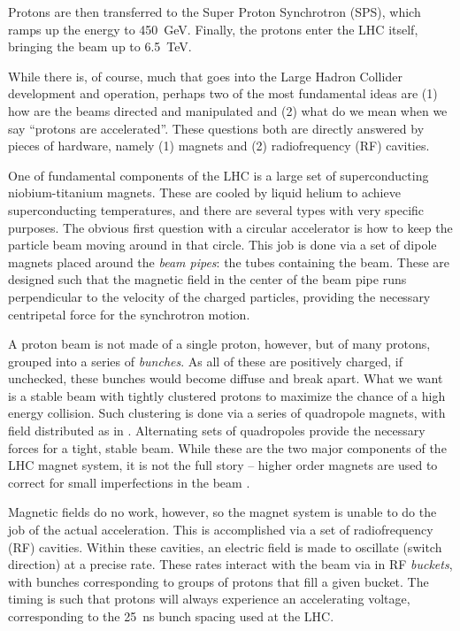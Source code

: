 Protons are then transferred to the Super Proton Synchrotron (SPS), which ramps up the energy to 
\SI{450}{\GeV}. Finally, the protons enter the LHC itself, bringing the beam up to \SI{6.5}{\TeV}. 

While there is, of course, much that goes into the Large Hadron Collider development and operation, perhaps
two of the most fundamental ideas are (1) how are the beams directed and manipulated and (2) what do we 
mean when we say ``protons are accelerated''. These questions both are directly answered by pieces of hardware,
namely (1) magnets and (2) radiofrequency (RF) cavities.

One of fundamental components of the LHC is a large set of superconducting niobium-titanium magnets. These 
are cooled by liquid helium to achieve superconducting temperatures, and there are several types with very 
specific purposes. The obvious first question with a circular accelerator is how to keep the particle beam 
moving around in that circle. This job is done via a set of dipole magnets placed around the \emph{beam pipes}: the 
tubes containing the beam. These are designed such that the magnetic field in the center of the beam pipe runs 
perpendicular to the velocity of the charged particles, providing the necessary centripetal force for 
the synchrotron motion.

A proton beam is not made of a single proton, however, but of many protons, grouped into a series of \emph{bunches}.
As all of these are positively charged, if unchecked, these bunches would become diffuse and break apart. What we 
want is a stable beam with tightly clustered protons to maximize the chance of a high energy collision.
Such clustering is done via a series of quadropole magnets, with field distributed as in 
. Alternating sets of quadropoles provide the necessary forces for a tight, 
stable beam. While these are the two major components of the LHC magnet system, it is not the full story -- higher order 
magnets are used to correct for small imperfections in the beam .

Magnetic fields do no work, however, so the magnet system is unable to do the job of the actual acceleration. This is 
accomplished via a set of radiofrequency (RF) cavities. Within these cavities, an electric field is made to 
oscillate (switch direction) at a precise rate. These rates interact with the beam via in RF \emph{buckets}, with 
bunches corresponding to groups of protons that fill a given bucket. The timing is such that protons will always 
experience an accelerating voltage, corresponding to the \SI{25}{\ns} bunch spacing used at the LHC.

